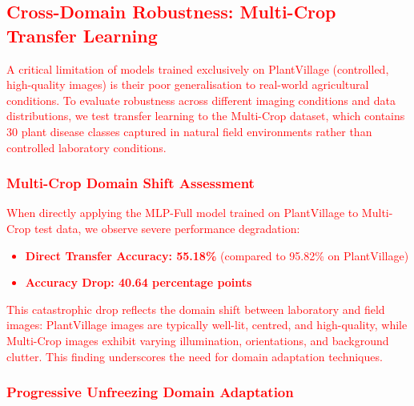 {%
%
%

\subsection{\textcolor{red}{Cross-Domain Robustness: Multi-Crop Transfer Learning}}

\textcolor{red}{
A critical limitation of models trained exclusively on PlantVillage (controlled, high-quality images) is their poor generalisation to real-world agricultural conditions. To evaluate robustness across different imaging conditions and data distributions, we test transfer learning to the Multi-Crop dataset, which contains 30 plant disease classes captured in natural field environments rather than controlled laboratory conditions.

\subsubsection{\textcolor{red}{Multi-Crop Domain Shift Assessment}}

When directly applying the MLP-Full model trained on PlantVillage to Multi-Crop test data, we observe severe performance degradation:
\begin{itemize}
\item \textbf{\textcolor{red}{Direct Transfer Accuracy: 55.18\%}} (compared to 95.82\% on PlantVillage)
\item \textbf{\textcolor{red}{Accuracy Drop: 40.64 percentage points}}
\end{itemize}

This catastrophic drop reflects the domain shift between laboratory and field images: PlantVillage images are typically well-lit, centred, and high-quality, while Multi-Crop images exhibit varying illumination, orientations, and background clutter. This finding underscores the need for domain adaptation techniques.

\subsubsection{\textcolor{red}{Progressive Unfreezing Domain Adaptation}}

}}
